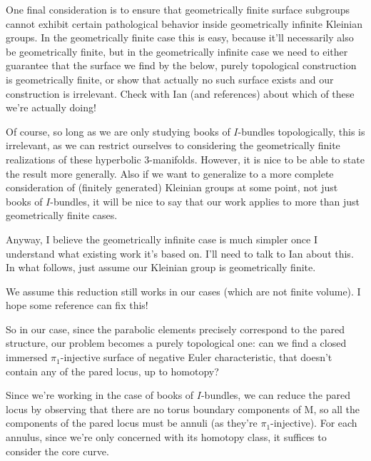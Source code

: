 {One final consideration is to ensure that geometrically finite surface
subgroups cannot exhibit certain pathological behavior inside geometrically
infinite Kleinian groups. In the geometrically finite case this is easy,
because it'll necessarily also be geometrically finite, but in the
geometrically infinite case we need to either guarantee that the surface we
find by the below, purely topological construction is geometrically finite, or
show that actually no such surface exists and our construction is irrelevant.
Check with Ian (and references) about which of these we're actually doing!

Of course, so long as we are only studying books of $I$-bundles topologically,
this is irrelevant, as we can restrict ourselves to considering the
geometrically finite realizations of these hyperbolic 3-manifolds. However, it
is nice to be able to state the result more generally. Also if we want to
generalize to a more complete consideration of (finitely generated) Kleinian
groups at some point, not just books of $I$-bundles, it will be nice to say that
our work applies to more than just geometrically finite cases.

Anyway, I believe the geometrically infinite case is much simpler once
I understand what existing work it's based on. I'll need to talk to Ian about
this. In what follows, just assume our Kleinian group is geometrically finite.

%
%
%

We assume this reduction still works in our cases (which are not finite
volume). I hope some reference can fix this!

So in our case, since the parabolic elements precisely correspond to the pared
structure, our problem becomes a purely topological one: can we find a closed
immersed $\pi_1$-injective surface of negative Euler characteristic, that
doesn't contain any of the pared locus, up to homotopy?

Since we're working in the case of books of $I$-bundles, we can reduce the
pared locus by observing that there are no torus boundary components of M, so
all the components of the pared locus must be annuli (as they're
$\pi_1$-injective). For each annulus, since we're only concerned with its
homotopy class, it suffices to consider the core curve.

}
